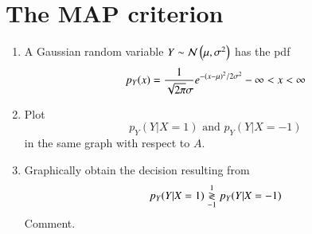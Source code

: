 \documentclass[journal,12pt,twocolumn]{IEEEtran}
\renewcommand\thesection{\arabic{section}}
\begin{document}
%
\section{The MAP criterion}
\begin{enumerate}[label=\thesection.\arabic*
,ref=\thesection.\theenumi]

%
\item A Gaussian random variable $Y\sim\mathcal{N}\left(\mu,\sigma^2\right)$ has the pdf
%
\begin{equation}
p_{Y}(x) = \frac{1}{\sqrt{2\pi}\sigma}e^{-\left(x-\mu\right)^2/2\sigma^2} - \infty < x < \infty
\end{equation}
%
\item Plot
\begin{equation}
p_{Y}(Y|X=1) \text{ and } p_{Y}(Y|X=-1)
\end{equation}
in the same graph with respect to $A$.


\item
Graphically obtain the decision resulting from
\begin{equation}
p_{Y}(Y|X=1) \overset{1}{\underset{-1}{\gtrless}} p_{Y}(Y|X=-1)
\end{equation}
Comment.
\end{enumerate}
\end{document}
